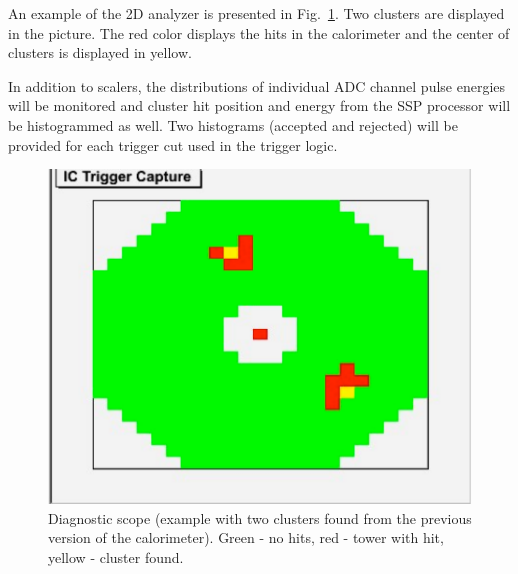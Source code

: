 An example of the 2D analyzer is presented in Fig.~\ref{fig:dvcs_2_cluster}. Two clusters are displayed
in the picture. The red color displays the hits in the calorimeter and  the center of clusters is displayed in yellow.

In addition to scalers, the distributions of individual ADC channel pulse energies will be monitored and  cluster hit position and energy from the SSP processor will be histogrammed as well. Two histograms (accepted and rejected) will be provided for each trigger cut used in the trigger logic.



\begin{figure}[t]
\includegraphics[scale=0.8]{daq_trigger/figures/dvcs_2_cluster}
\caption{\small{Diagnostic scope (example with two clusters found from the previous version of the calorimeter). Green - no hits, red - tower with hit, yellow - cluster found.}}
\label{fig:dvcs_2_cluster}
\end{figure}




